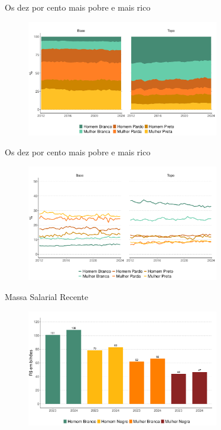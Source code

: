 \documentclass[10pt, xcolor=x11names,compress]{beamer}
\begin{document}
	\begin{frame}{Os dez por cento mais pobre e mais rico}
		\begin{figure}
			\centering
			\includegraphics[width = 0.75\textwidth]{figures_output/base_topo_10_ppb.pdf}
		\end{figure}
	\end{frame}
	
		\begin{frame}{Os dez por cento mais pobre e mais rico}
		\begin{figure}
			\centering
			\includegraphics[width = 0.75\textwidth]{figures_output/base_topo_10_ppb_linha.pdf}
		\end{figure}
	\end{frame}
	
	\begin{frame}{Massa Salarial Recente}
		\begin{figure}
			\centering
			\includegraphics[width = 0.75\textwidth]{figures_output/massa_habitual.pdf}
		\end{figure}
	\end{frame}
	
\end{document}
